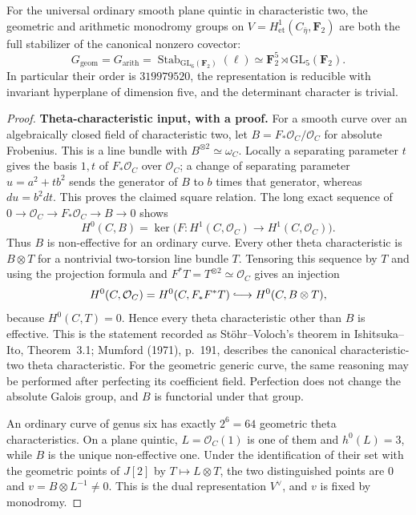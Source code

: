 \begin{theorem}\label{thm:quintic-char2-monodromy}
For the universal ordinary smooth plane quintic in characteristic two,
the geometric and arithmetic monodromy groups on
$V=H^1_{\mathrm{et}}(C_{\bar\eta},\mathbf F_2)$ are both the full
stabilizer of the canonical nonzero covector:
\[
 G_{\mathrm{geom}}=G_{\mathrm{arith}}
 =\operatorname{Stab}_{\mathrm{GL}_6(\mathbf F_2)}(\ell)
 \simeq\mathbf F_2^5\rtimes\mathrm{GL}_5(\mathbf F_2).
\]
In particular their order is $319979520$, the representation is
reducible with invariant hyperplane of dimension five, and the
determinant character is trivial.
\end{theorem}
\begin{proof}

\par\smallskip\noindent\textbf{Theta-characteristic input, with a proof.}
For a smooth curve over an algebraically closed field of characteristic
two, let $B=F_*\mathcal O_C/\mathcal O_C$ for absolute Frobenius.
This is a line bundle with $B^{\otimes2}\simeq\omega_C$.
Locally a separating parameter $t$ gives the basis $1,t$ of
$F_*\mathcal O_C$ over $\mathcal O_C$; a change of separating parameter
$u=a^2+tb^2$ sends the generator of $B$ to $b$ times that generator,
whereas $du=b^2dt$.  This proves the claimed square relation.
The long exact sequence of
$0\to\mathcal O_C\to F_*\mathcal O_C\to B\to0$ shows
\[
 H^0(C,B)=\ker\bigl(F:H^1(C,\mathcal O_C)\to H^1(C,\mathcal O_C)\bigr).
\]
Thus $B$ is non-effective for an ordinary curve.
Every other theta characteristic is $B\otimes T$ for a nontrivial
two-torsion line bundle $T$.  Tensoring this sequence by $T$ and using
the projection formula and $F^*T=T^{\otimes2}\simeq\mathcal O_C$
gives an injection
\[
 H^0(C,\mathcal O_C)=H^0(C,F_*F^*T)
 \lhook\joinrel\longrightarrow H^0(C,B\otimes T),
\]
because $H^0(C,T)=0$.  Hence every theta characteristic other than $B$
is effective.  This is the statement recorded as St\"ohr--Voloch's
theorem in Ishitsuka--Ito, Theorem~3.1; Mumford (1971), p.~191,
describes the canonical characteristic-two theta characteristic.
For the geometric generic curve, the same reasoning may be performed
after perfecting its coefficient field.  Perfection does not change
the absolute Galois group, and $B$ is functorial under that group.

An ordinary curve of genus six has exactly $2^6=64$ geometric theta
characteristics.  On a plane quintic, $L=\mathcal O_C(1)$ is one of
them and $h^0(L)=3$, while $B$ is the unique non-effective one.
Under the identification of their set with the geometric points of
$J[2]$ by $T\mapsto L\otimes T$, the two distinguished points are
$0$ and $v=B\otimes L^{-1}\ne0$.  This is the dual representation
$V^\vee$, and $v$ is fixed by monodromy.


\end{proof}

